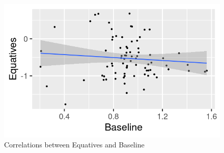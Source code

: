 \documentclass[
  ignorenonframetext,
]{beamer}
\begin{document}
\begin{frame}
\begin{figure}

{\centering \includegraphics{"equatives_baseline_corr.png"}

}

\caption{Correlations between Equatives and Baseline}

\end{figure}
\end{frame}
\end{document}
